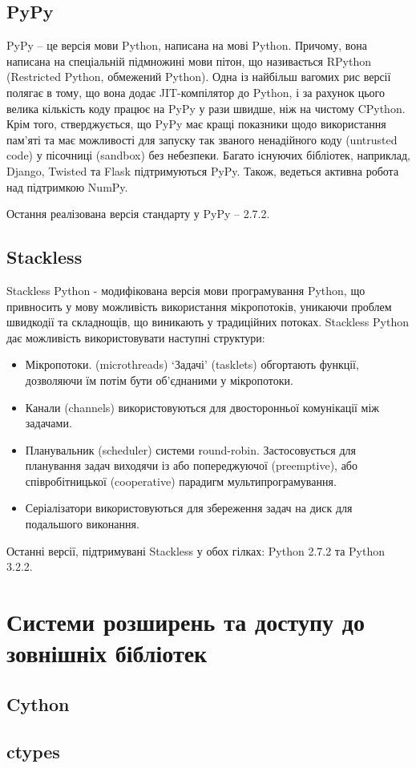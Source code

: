 \documentclass[a4paper, 12pt, onsedie]{article}
\begin{document}
\subsection{PyPy}
PyPy -- це версія мови Python, написана на мові Python. Причому, вона написана на спеціальній 
підмножині мови пітон, що називається RPython (Restricted Python, обмежений Python). Одна 
із найбільш вагомих рис версії полягає в тому, що вона додає JIT-компілятор до Python, і за 
рахунок цього велика кількість коду працює на PyPy у рази швидше, ніж на чистому CPython. 
Крім того, стверджується, що PyPy має кращі показники щодо використання пам'яті та має 
можливості для запуску так званого ненадійного коду (untrusted code) у пісочниці (sandbox) 
без небезпеки. Багато існуючих бібліотек, наприклад, Django, Twisted та Flask підтримуються 
PyPy. Також, ведеться активна робота над підтримкою NumPy.

Остання реалізована версія стандарту у PyPy -- 2.7.2.

\subsection{Stackless}
Stackless Python - модифікована версія мови програмування Python, що привносить у мову
можливість використання мікропотоків, уникаючи проблем швидкодії та складнощів, що виникають
у традиційних потоках. Stackless Python дає можливість використовувати наступні структури:
\begin{itemize}
    \item Мікропотоки. (microthreads) `Задачі' (tasklets) обгортають функції, дозволяючи їм 
          потім бути об'єднаними у мікропотоки.
    \item Канали (channels) використовуються для двосторонньої комунікації між задачами.
    \item Планувальник (scheduler) системи round-robin. Застосовується для планування
          задач виходячи із або попереджуючої (preemptive), або співробітницької (cooperative) 
          парадигм мультипрограмування.
    \item Серіалізатори використовуються для збереження задач на диск для подальшого виконання.
\end{itemize}

Останні версії, підтримувані Stackless у обох гілках: Python 2.7.2 та Python 3.2.2.

\section{Системи розширень та доступу до зовнішніх бібліотек}

\subsection{Cython}

\subsection{ctypes}
\end{document}
